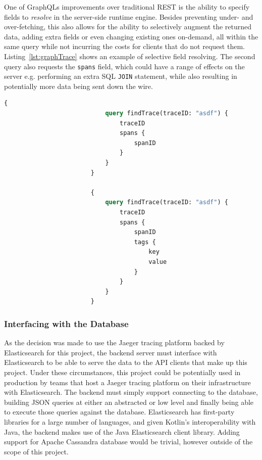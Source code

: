 \documentclass[12pt,pdftex,titlepage]{report}
\begin{document}
                    One of GraphQLs improvements over traditional REST is the ability to specify fields to \textit{resolve} in the server-side runtime engine. Besides preventing
                    under- and over-fetching, this also allows for the ability to selectively augment the returned data, adding extra fields or even changing existing ones on-demand,
                    all within the same query while not incurring the costs for clients that do not request them. Listing~\ref{lst:graphTrace} shows an example of selective field
                    resolving. The second query also requests the \texttt{spans} field, which could have a range of effects on the server e.g. performing an extra SQL \texttt{JOIN}
                    statement, while also resulting in potentially more data being sent down the wire.

                    \begin{lstlisting}[caption={GraphQL query to fetch a trace object and the span ID of each of its spans vs a query to fetch the trace object, its spans and every
                        tag of every span.}, label={lst:graphTrace}, language=GraphQL, gobble=24]
                        {
                            query findTrace(traceID: "asdf") {
                                traceID
                                spans {
                                    spanID
                                }
                            }
                        }

                        {
                            query findTrace(traceID: "asdf") {
                                traceID
                                spans {
                                    spanID
                                    tags {
                                        key
                                        value
                                    }
                                }
                            }
                        }
                    \end{lstlisting}

                \subsubsection{Interfacing with the Database}
                    As the decision was made to use the Jaeger tracing platform backed by Elasticsearch for this project, the backend server must interface with Elasticsearch
                    to be able to serve the data to the API clients that make up this project. Under these circumstances, this project could be potentially used in production
                    by teams that host a Jaeger tracing platform on their infrastructure with Elasticsearch. The backend must simply support connecting to the database, building 
                    JSON queries at either an abstracted or low level and finally being able to execute those queries against the database. Elasticsearch has first-party libraries
                    for a  large number of languages, and given Kotlin's interoperability with Java, the backend makes use of the Java Elasticsearch client library. Adding support 
                    for Apache Cassandra database would be trivial, however outside of the scope of this project.
\end{document}
